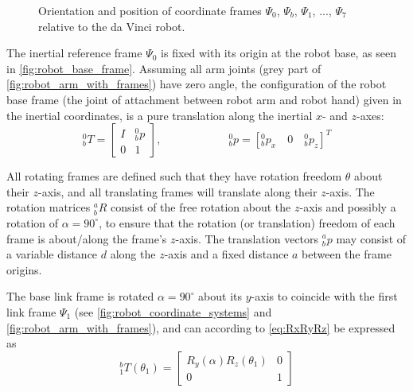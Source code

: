 \begin{figure}[htbp]
	\hspace{-10mm}
	\vspace{1mm}
	\hspace{10mm}
	\caption{Orientation and position of coordinate frames $\Psi_0$, $\Psi_b$, $\Psi_1$, ..., $\Psi_7$ relative to the da Vinci robot.}
	\label{fig:robot_frames}
\end{figure}

The inertial reference frame $\Psi_0$ is fixed with its origin at the robot base, as seen in \autoref{fig:robot_base_frame}. Assuming all arm joints (grey part of \autoref{fig:robot_arm_with_frames}) have zero angle, the configuration of the robot base frame (the joint of attachment between robot arm and robot hand) given in the inertial coordinates, is a pure translation along the inertial $x$- and $z$-axes:
\begin{equation}
^0_b T = \begin{bmatrix}
I & ^0_bp\\
0 & 1
\end{bmatrix}, 
\qquad\qquad\qquad
^0_bp = [^0_bp_x \quad 0 \quad ^0_bp_z]^T
\end{equation}

All rotating frames are defined such that they have rotation freedom $\theta$ about their $z$-axis, and all translating frames will translate along their $z$-axis. The rotation matrices $^a_bR$ consist of the free rotation about the $z$-axis and possibly a rotation of $\alpha=90^\circ$, to ensure that the rotation (or translation) freedom of each frame is about/along the frame's $z$-axis. The translation vectors $^a_bp$ may consist of a variable distance $d$ along the $z$-axis and a fixed distance $a$ between the frame origins.

The base link frame is rotated $\alpha=90^\circ$ about its $y$-axis to coincide with the first link frame $\Psi_1$ (see \autoref{fig:robot_coordinate_systems} and \ref{fig:robot_arm_with_frames}), and can according to \autoref{eq:RxRyRz} be expressed as
\begin{equation}
^b_1 T(\theta_1) = 
\begin{bmatrix}
R_y(\alpha) R_z(\theta_1) & 0\\
0 & 1
\end{bmatrix}
\end{equation}

